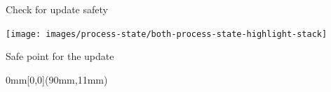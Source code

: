 \begin{frame}{Check for update safety}%
\vspace*{-3mm}%
\begin{center}%
\texttt{[image: images/process-state/both-process-state-highlight-stack]}%
\end{center}%
\end{frame}

\begin{frame}[t,label=suspend]{Safe point for the update}%
\begin{textblock*}{0mm}[0,0](90mm,11mm)%
%

\end{textblock*}
\end{frame}

